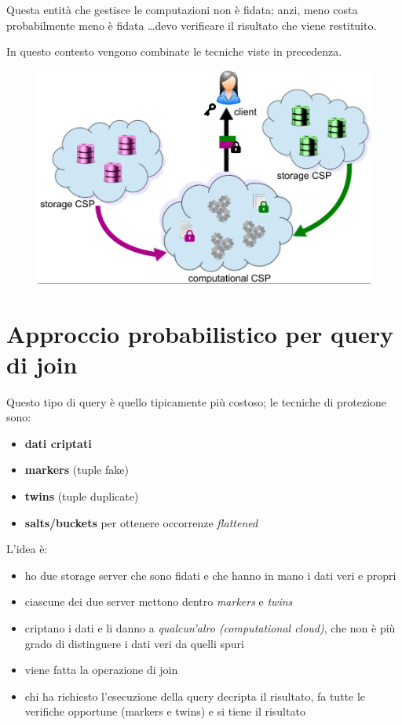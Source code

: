 \documentclass{report}
\begin{document}
\noindent Questa entità che gestisce le computazioni non è fidata; anzi, meno costa probabilmente 
meno è fidata \dots devo verificare il risultato che viene restituito.

\noindent In questo contesto vengono combinate le tecniche viste in precedenza.

\begin{figure}[H]
    \centering
    \includegraphics[width=0.8\linewidth]{images/scenario.png}
\end{figure}

\section{Approccio probabilistico per query di join}
Questo tipo di query è quello tipicamente più costoso; le tecniche di protezione 
sono:
\begin{itemize}
    \item \textbf{dati criptati}
    \item \textbf{markers} (tuple fake)
    \item \textbf{twins} (tuple duplicate)
    \item \textbf{salts/buckets} per ottenere occorrenze \textit{flattened}
\end{itemize}


L'idea è:
\begin{itemize}
    \item ho due storage server che sono fidati e che hanno in mano i dati veri e propri
    \item ciascune dei due server mettono dentro \textit{markers} e \textit{twins}
    \item criptano i dati e li danno a \textit{qualcun'alro (computational cloud)}, che non è più 
    grado di distinguere i dati veri da quelli spuri
    \item viene fatta la operazione di join 
    \item chi ha richiesto l'esecuzione della query decripta il risultato, fa tutte le verifiche opportune 
    (markers e twins) e si tiene il risultato
\end{itemize}
\end{document}
